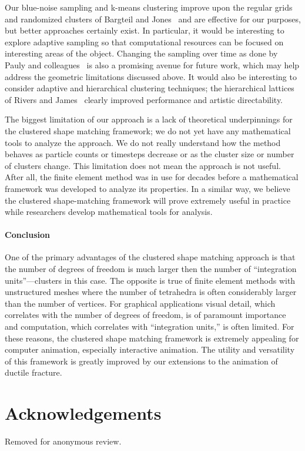 \documentclass[review]{acmsiggraph}
\begin{document}
Our blue-noise sampling and k-means clustering improve upon the regular grids and
randomized clusters of Bargteil and Jones~ and are effective for our purposes,
but better approaches certainly exist.  In particular, it would be interesting to explore adaptive sampling
so that computational resources can be focused on interesting areas of the object.  
Changing the sampling over time as done by Pauly and colleagues~
is also a promising avenue for future work, which may help address the geometric limitations discussed above.
It would also be interesting
to consider adaptive and hierarchical clustering techniques; the hierarchical lattices of Rivers and James~\cite{Rivers:2007:FFL}
clearly improved performance and artistic directability.  

The biggest limitation of our approach is a lack of theoretical underpinnings for the clustered shape matching
framework; we do not yet have any mathematical tools to analyze the approach.  We do not really understand
how the method behaves as particle counts or timesteps decrease or as the cluster size or number of clusters change.
This limitation does not mean the approach is not useful.  After all, the finite element method was in use
for decades before a mathematical framework was developed to analyze its properties.  In a similar way,
we believe the clustered shape-matching framework will prove extremely useful in practice while
researchers develop mathematical tools for analysis. 

\paragraph{Conclusion} 
One of the primary advantages of the clustered shape matching approach is that the number of degrees of freedom
is much larger then the number of ``integration units''---clusters in this case.  The opposite is true of finite element
methods with unstructured meshes where the number of tetrahedra is often considerably larger than the number of vertices.  
For graphical applications visual detail, which correlates with the number of degrees of freedom, is of paramount importance
and computation, which correlates with ``integration units,'' is often limited.  
For these reasons, the clustered shape matching framework is extremely appealing for computer animation, 
especially interactive animation.  The utility and versatility of this framework is greatly improved by our extensions 
to the animation of ductile fracture.




\section*{Acknowledgements}
Removed for anonymous review.



\end{document}
